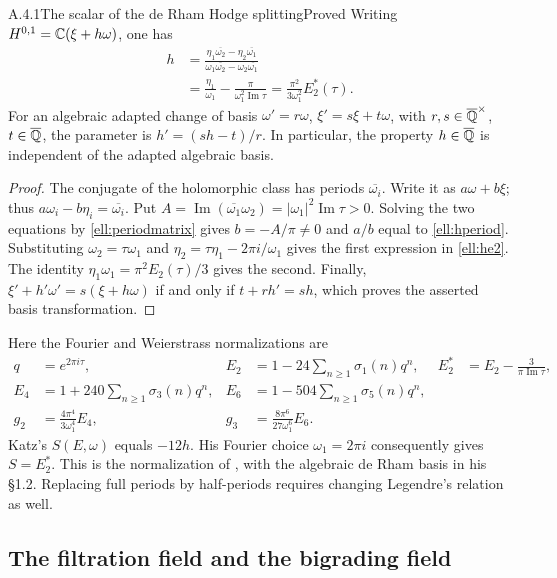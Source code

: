 \begin{result}{A.4.1}{The scalar of the de Rham Hodge splitting}{Proved}
Writing $H^{0,1}=\mathbb C(\xi+h\omega)$, one has
\begin{align}
 h&=\frac{\eta_1\overline{\omega_2}-\eta_2\overline{\omega_1}}
 {\omega_1\overline{\omega_2}-\omega_2\overline{\omega_1}}\label{ell:hperiod}\\
 &=\frac{\eta_1}{\omega_1}-\frac{\pi}{\omega_1^2\operatorname{Im}\tau}
 =\frac{\pi^2}{3\omega_1^2}E_2^*(\tau).\label{ell:he2}
\end{align}
For an algebraic adapted change of basis $\omega'=r\omega$, $\xi'=s\xi+t\omega$, with $r,s\in\overline{\mathbb Q}^\times$, $t\in\overline{\mathbb Q}$, the parameter is $h'=(sh-t)/r$. In particular, the property $h\in\overline{\mathbb Q}$ is independent of the adapted algebraic basis.
\end{result}
\begin{proof}
The conjugate of the holomorphic class has periods $\overline{\omega_i}$. Write it as $a\omega+b\xi$; thus $a\omega_i-b\eta_i=\overline{\omega_i}$. Put $A=\operatorname{Im}(\overline{\omega_1}\omega_2)=|\omega_1|^2\operatorname{Im}\tau>0$. Solving the two equations by \eqref{ell:periodmatrix} gives $b=-A/\pi\ne0$ and $a/b$ equal to \eqref{ell:hperiod}. Substituting $\omega_2=\tau\omega_1$ and $\eta_2=\tau\eta_1-2\pi i/\omega_1$ gives the first expression in \eqref{ell:he2}. The identity $\eta_1\omega_1=\pi^2 E_2(\tau)/3$ gives the second. Finally,
$\xi'+h'\omega'=s(\xi+h\omega)$ if and only if $t+rh'=sh$, which proves the asserted basis transformation.
\end{proof}

Here the Fourier and Weierstrass normalizations are
\begin{align*}
 q&=e^{2\pi i\tau},& E_2&=1-24\sum_{n\ge1}\sigma_1(n)q^n,
 &E_2^*&=E_2-\frac3{\pi\operatorname{Im}\tau},\\
 E_4&=1+240\sum_{n\ge1}\sigma_3(n)q^n,
 &E_6&=1-504\sum_{n\ge1}\sigma_5(n)q^n,\\
 g_2&=\frac{4\pi^4}{3\omega_1^4}E_4,
 &g_3&=\frac{8\pi^6}{27\omega_1^6}E_6.
\end{align*}
Katz's $S(E,\omega)$ equals $-12h$. His Fourier choice $\omega_1=2\pi i$ consequently gives $S=E_2^*$. This is the normalization of \cite[Lemma 1.3.6 and (1.3.7), p.467; (1.3.10), p.468]{EllKatz1976}, with the algebraic de Rham basis in his \S1.2. Replacing full periods by half-periods requires changing Legendre's relation as well.

\subsection{The filtration field and the bigrading field}

